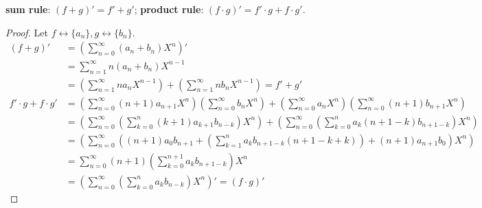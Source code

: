 \documentclass[a4paper, 12pt]{report}
\begin{document}
\begin{prop}\label{prop:gf-sum-product-rules}
\textbf{sum rule}: $(f + g)' = f' + g'$; \textbf{product rule}: $(f \cdot g)' = f' \cdot g + f \cdot g'$.
\end{prop}
\begin{proof}
Let $f \longleftrightarrow \{a_n\}, g \longleftrightarrow \{b_n\}$. 
\begin{align*}
    (f + g)'
    &= \left(\sum_{n = 0}^\infty (a_n + b_n) X^n\right)'\\
    &= \sum_{n = 1}^\infty n (a_n + b_n) X^{n - 1}\\
    &= \left(\sum_{n = 1}^\infty n a_n X^{n - 1}\right) 
     + \left(\sum_{n = 1}^\infty n b_n X^{n - 1}\right)
     = f' + g'\\
    f' \cdot g + f \cdot g'
    &= \left(\sum_{n = 0}^\infty (n + 1) a_{n + 1} X^n\right)
       \left(\sum_{n = 0}^\infty b_n X^n\right)
     + \left(\sum_{n = 0}^\infty a_n X^n\right)
       \left(\sum_{n = 0}^\infty (n + 1) b_{n + 1} X^n\right)\\
    &= \left(\sum_{n = 0}^\infty \left(\sum_{k = 0}^n (k + 1) a_{k + 1} b_{n - k} \right) X^n\right)
     + \left(\sum_{n = 0}^\infty \left(\sum_{k = 0}^n a_k (n + 1 - k) b_{n + 1 - k } \right) X^n\right)\\
    &= \left(\sum_{n = 0}^\infty \left((n + 1) a_0 b_{n + 1} + \left(\sum_{k = 1}^n a_k b_{n + 1 - k} (n + 1 - k + k)\right) + (n + 1) a_{n + 1} b_0\right) X^n\right)\\
    &= \sum_{n = 0}^\infty (n + 1) \left(\sum_{k = 0}^{n + 1} a_k b_{n + 1 - k}\right) X^n\\
    &= \left(\sum_{n = 0}^\infty \left(\sum_{k = 0}^n a_k b_{n - k}\right) X^n\right)'
     = (f \cdot g)'
\end{align*}
\end{proof}
\end{document}
